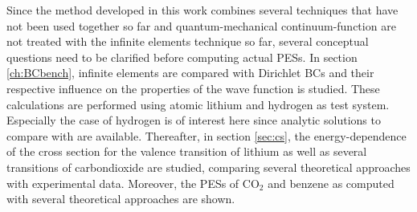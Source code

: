 \label{ch:res}
Since the method developed in this work combines several techniques that have not been used together so far and quantum-mechanical continuum-function are not treated with the infinite elements technique so far, several conceptual questions need to be clarified before computing actual PESs.
In section \ref{ch:BCbench}, infinite elements are compared with Dirichlet BCs and their respective influence on the properties of the wave function is studied. %
These calculations are performed using atomic lithium and hydrogen as test system.
Especially the case of hydrogen is of interest here since analytic solutions to compare with are available.
Thereafter, in section \ref{sec:cs}, the energy-dependence of the cross section for the valence transition of lithium as well as several transitions of carbondioxide are studied, comparing several theoretical approaches with experimental data.
Moreover, the PESs of CO$_2$ and benzene as computed with several theoretical approaches are shown.

